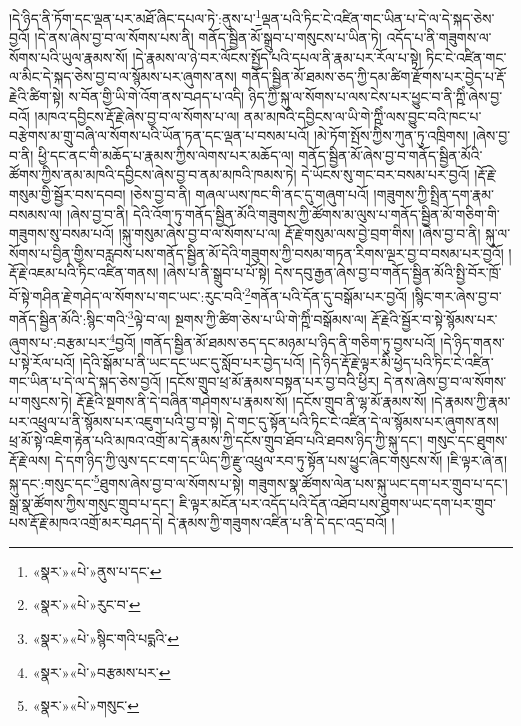 །དེ་ཉིད་ནི་ཏོག་དང་ལྡན་པར་མཐོ་ཞིང་དཔལ་ཏེ་:ནུས་པ་\footnote{«སྣར་»«པེ་»ནུས་པ་དང་}ལྡན་པའི་ཏིང་ངེ་འཛིན་གང་ཡིན་པ་དེ་ལ་དེ་སྐད་ཅེས་བྱའོ། །དེ་ནས་ཞེས་བྱ་བ་ལ་སོགས་པས་ནི། གནོད་སྦྱིན་མོ་སྒྲུབ་པ་གསུངས་པ་ཡིན་ཏེ། འདོད་པ་ནི་གཟུགས་ལ་སོགས་པའི་ཡུལ་རྣམས་སོ། །དེ་རྣམས་ལ་ཉེ་བར་ལོངས་སྤྱོད་པའི་དཔལ་ནི་རྣམ་པར་རོལ་པ་སྟེ། ཏིང་ངེ་འཛིན་གང་ལ་མིང་དེ་སྐད་ཅེས་བྱ་བ་ལ་སྙོམས་པར་ཞུགས་ནས། གནོད་སྦྱིན་མོ་ཐམས་ཅད་ཀྱི་དམ་ཚིག་རྫོགས་པར་བྱེད་པ་རྡོ་རྗེའི་ཚིག་སྟེ། ས་བོན་གྱི་ཡི་གེ་འོག་ནས་བཤད་པ་འདི། ཉིད་ཀྱི་སྐུ་ལ་སོགས་པ་ལས་ངེས་པར་ཕྱུང་བ་ནི་ཀྵིཾ་ཞེས་བྱ་བའོ། །མཁའ་དབྱིངས་རྡོ་རྗེ་ཞེས་བྱ་བ་ལ་སོགས་པ་ལ། ནམ་མཁའི་དབྱིངས་ལ་ཡི་གེ་ཀྵིཾ་ལས་བྱུང་བའི་ཁང་པ་བརྩེགས་མ་གྲུ་བཞི་ལ་སོགས་པའི་ཡོན་ཏན་དང་ལྡན་པ་བསམ་པའོ། །མེ་ཏོག་སྤོས་ཀྱིས་ཀུན་ཏུ་འཁྲིགས། །ཞེས་བྱ་བ་ནི། ཕྱི་དང་ནང་གི་མཆོད་པ་རྣམས་ཀྱིས་ལེགས་པར་མཆོད་ལ། གནོད་སྦྱིན་མོ་ཞེས་བྱ་བ་གནོད་སྦྱིན་མོའི་ཚོགས་ཀྱིས་ནམ་མཁའི་དབྱིངས་ཞེས་བྱ་བ་ནམ་མཁའི་ཁམས་ཏེ། དེ་ཡོངས་སུ་གང་བར་བསམ་པར་བྱའོ། །རྡོ་རྗེ་གསུམ་གྱི་སྦྱོར་བས་དབབ། །ཅེས་བྱ་བ་ནི། གཞལ་ཡས་ཁང་གི་ནང་དུ་གཞུག་པའོ། །གཟུགས་ཀྱི་སྤྲིན་དག་རྣམ་བསམས་ལ། །ཞེས་བྱ་བ་ནི། དེའི་འོག་ཏུ་གནོད་སྦྱིན་མོའི་གཟུགས་ཀྱི་ཚོགས་མ་ལུས་པ་གནོད་སྦྱིན་མོ་གཅིག་གི་གཟུགས་སུ་བསམ་པའོ། །སྐུ་གསུམ་ཞེས་བྱ་བ་ལ་སོགས་པ་ལ། རྡོ་རྗེ་གསུམ་ལས་བྱེ་བྲག་གིས། །ཞེས་བྱ་བ་ནི། སྐུ་ལ་སོགས་པ་བྱིན་གྱིས་བརླབས་པས་གནོད་སྦྱིན་མོ་དེའི་གཟུགས་ཀྱི་བསམ་གཏན་རིགས་ལྔར་བྱ་བ་བསམ་པར་བྱའོ། །རྡོ་རྗེ་འཇམ་པའི་ཏིང་འཛིན་གནས། །ཞེས་པ་ནི་སྒྲུབ་པ་པོ་སྟེ། དེས་དབུ་རྒྱན་ཞེས་བྱ་བ་གནོད་སྦྱིན་མོའི་སྤྱི་བོར་ཁྲོ་བོ་སྟེ་གཤིན་རྗེ་གཤེད་ལ་སོགས་པ་གང་ཡང་:རུང་བའི་\footnote{«སྣར་»«པེ་»རུང་བ་}གནོན་པའི་དོན་དུ་བསྒོམ་པར་བྱའོ། །སྙིང་གར་ཞེས་བྱ་བ་གནོད་སྦྱིན་མོའི་:སྙིང་གའི་\footnote{«སྣར་»«པེ་»སྙིང་གའི་པདྨའི་}ལྟེ་བ་ལ། སྔགས་ཀྱི་ཚིག་ཅེས་པ་ཡི་གེ་ཀྵིཾ་བསྒོམས་ལ། རྡོ་རྗེའི་སྦྱོར་བ་སྟེ་སྙོམས་པར་ཞུགས་པ་:བརྩམ་པར་\footnote{«སྣར་»«པེ་»བརྩམས་པར་}བྱའོ། །གནོད་སྦྱིན་མོ་ཐམས་ཅད་དང་མཉམ་པ་ཉིད་ནི་གཅིག་ཏུ་བྱས་པའོ། །དེ་ཉིད་གནས་པ་སྟེ་རོལ་པའོ། །དེའི་སྒོམ་པ་ནི་ཡང་དང་ཡང་དུ་སློབ་པར་བྱེད་པའོ། །དེ་ཉིད་རྡོ་རྗེ་ལྟར་མི་ཕྱེད་པའི་ཏིང་ངེ་འཛིན་གང་ཡིན་པ་དེ་ལ་དེ་སྐད་ཅེས་བྱའོ། །དངོས་གྲུབ་ཕྲ་མོ་རྣམས་བསྟན་པར་བྱ་བའི་ཕྱིར། དེ་ནས་ཞེས་བྱ་བ་ལ་སོགས་པ་གསུངས་ཏེ། རྡོ་རྗེའི་སྔགས་ནི་དེ་བཞིན་གཤེགས་པ་རྣམས་སོ། །དངོས་གྲུབ་ནི་ལྷ་མོ་རྣམས་སོ། །དེ་རྣམས་ཀྱི་རྣམ་པར་འཕྲུལ་པ་ནི་སྙོམས་པར་འཇུག་པའི་བྱ་བ་སྟེ། དེ་གང་དུ་སྟོན་པའི་ཏིང་ངེ་འཛིན་དེ་ལ་སྙོམས་པར་ཞུགས་ནས། ཕྲ་མོ་སྟེ་འཇིག་རྟེན་པའི་མཁའ་འགྲོ་མ་དེ་རྣམས་ཀྱི་དངོས་གྲུབ་ཐོབ་པའི་ཐབས་ཉིད་ཀྱི་སྐུ་དང་། གསུང་དང་ཐུགས་རྡོ་རྗེ་ལས། དེ་དག་ཉིད་ཀྱི་ལུས་དང་ངག་དང་ཡིད་ཀྱི་རྫུ་འཕྲུལ་རབ་ཏུ་སྟོན་པས་ཕྱུང་ཞིང་གསུངས་སོ། །ཇི་ལྟར་ཞེ་ན། སྐུ་དང་:གསུང་དང་\footnote{«སྣར་»«པེ་»གསུང་}ཐུགས་ཞེས་བྱ་བ་ལ་སོགས་པ་སྟེ། གཟུགས་སྣ་ཚོགས་ལེན་པས་སྐུ་ཡང་དག་པར་གྲུབ་པ་དང་། སྒྲ་སྣ་ཚོགས་ཀྱིས་གསུང་གྲུབ་པ་དང་། ཇི་ལྟར་མངོན་པར་འདོད་པའི་དོན་འཐོབ་པས་ཐུགས་ཡང་དག་པར་གྲུབ་པས་རྡོ་རྗེ་མཁའ་འགྲོ་མར་བཤད་དེ། དེ་རྣམས་ཀྱི་གཟུགས་འཛིན་པ་ནི་དེ་དང་འདྲ་བའོ། །
